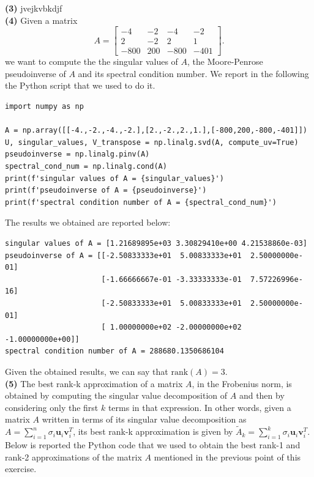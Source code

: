 \documentclass[a4paper,11pt]{article}
\begin{document}
\noindent \textbf{(3)} jvejkvbkdjf\\


\noindent \textbf{(4)} Given a matrix
\begin{equation}
	A = \begin{bmatrix}
		-4 & -2 & -4 & -2 \\
		2 & -2 & 2 & 1 \\
		-800 & 200 & -800 & -401
	\end{bmatrix}.
\end{equation}
we want to compute the the singular values of $A$, the Moore-Penrose pseudoinverse of $A$ and its spectral condition number. We report in the following the Python script that we used to do it.

\begin{verbatim}
import numpy as np

A = np.array([[-4.,-2.,-4.,-2.],[2.,-2.,2.,1.],[-800,200,-800,-401]])
U, singular_values, V_transpose = np.linalg.svd(A, compute_uv=True)
pseudoinverse = np.linalg.pinv(A)
spectral_cond_num = np.linalg.cond(A)
print(f'singular values of A = {singular_values}')
print(f'pseudoinverse of A = {pseudoinverse}')
print(f'spectral condition number of A = {spectral_cond_num}')
\end{verbatim}

\noindent The results we obtained are reported below:

\begin{verbatim}
singular values of A = [1.21689895e+03 3.30829410e+00 4.21538860e-03]
pseudoinverse of A = [[-2.50833333e+01  5.00833333e+01  2.50000000e-01]
                      [-1.66666667e-01 -3.33333333e-01  7.57226996e-16]
                      [-2.50833333e+01  5.00833333e+01  2.50000000e-01]
                      [ 1.00000000e+02 -2.00000000e+02 -1.00000000e+00]]
spectral condition number of A = 288680.1350686104
\end{verbatim}

\noindent Given the obtained results, we can say that $\text{rank}(A)=3$.\\

\noindent \textbf{(5)} The best rank-k approximation of a matrix $A$, in the Frobenius norm, is obtained by computing the singular value decomposition of $A$ and then by considering only the first $k$ terms in that expression. In other words, given a matrix $A$ written in terms of its singular value decomposition as $A = \sum_{i=1}^{n}\sigma_{i}\textbf{u}_{i}\textbf{v}_{i}^{T}$, its best rank-k approximation is given by $\tilde{A}_{k} = \sum_{i=1}^{k}\sigma_{i}\textbf{u}_{i}\textbf{v}_{i}^{T}$. Below is reported the Python code that we used to obtain the best rank-1 and rank-2 approximations of the matrix $A$ mentioned in the previous point of this exercise.
\end{document}
